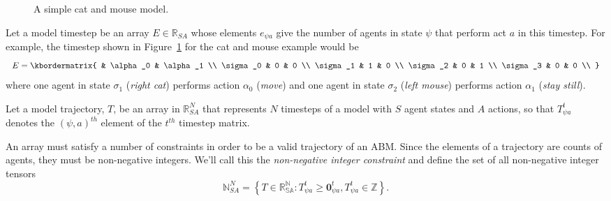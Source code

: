 \documentclass{article}
\begin{document}
\begin{figure}
	\centering
	\caption{A simple cat and mouse model.\label{fig:AB-MCMC-1}}
\end{figure}


Let a model timestep be an array $E \in \mathbb{R}_{SA}$ whose elements $e_{\psi a}$ give the number of agents in state $\psi$ that perform act $a$ in this timestep. For example, the timestep shown in Figure~\ref{fig:AB-MCMC-1} for the cat and mouse example would be
\[
E = \kbordermatrix{
	& \alpha_0 & \alpha_1 \\
	\sigma_0 & 0 & 0 \\
	\sigma_1 & 1 & 0 \\
	\sigma_2 & 0  & 1 \\
	\sigma_3 & 0 & 0 \\
}
\]
where one agent in state $\sigma_1$ (\textit{right cat}) performs action $\alpha_0$ (\textit{move}) and one agent in state $\sigma_2$ (\textit{left mouse}) performs action $\alpha_1$ (\textit{stay still}).

Let a model trajectory, $T$, be an array in $\mathbb{R}^N_{SA}$ that represents $N$ timesteps of a model with $S$ agent states and $A$ actions, so that $T^t_{\psi a}$ denotes the $(\psi, a)^{th}$ element of the $t^{th}$ timestep matrix.

An array must satisfy a number of constraints in order to be a valid trajectory of an ABM. Since the elements of a trajectory are counts of agents, they must be non-negative integers. We'll call this the \textit{non-negative integer constraint} and define the set of all non-negative integer tensors
\begin{equation}
\mathbb{N}^N_{SA} = \left\{ T \in \mathbb{R^N_{SA}}: T^t_{\psi a} \ge \mathbf{0}^t_{\psi a}, T^t_{\psi a} \in \mathbb{Z}\right\}.
\label{nonNegativeInt}
\end{equation}
\end{document}
